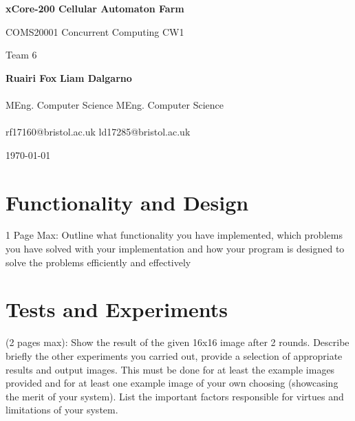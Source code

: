 \documentclass{article}
\begin{document}
    \begin{titlepage}
        \begin{center}
            \vspace*{2cm}
            
            {\huge \textbf{xCore-200 Cellular Automaton Farm}}
            
            \vspace{0.5cm}
            
            {\Large COMS20001 Concurrent Computing CW1}
            
            \vspace{0.5cm}
            
            {\large Team 6}
            
            \vspace{1cm}
            
            \hspace*{1cm} {\Large \textbf{Ruairi Fox}} \hfill {\Large \textbf{Liam Dalgarno}} \hspace*{1cm} \\~\\[-0.5em]
            \hspace*{1cm} MEng. Computer Science \hfill MEng. Computer Science  \hspace*{1cm} \\~\\[-1em]
            \hspace*{1cm} rf17160@bristol.ac.uk  \hfill ld17285@bristol.ac.uk  \hspace*{1cm} 
            
            \vspace{1cm}
            
            {\large \today}
        \end{center}
    \end{titlepage}

    \section{Functionality and Design}
    1 Page Max: Outline what functionality you have implemented, which problems you have solved with your implementation and how your program is designed to solve the problems efficiently and effectively
    \pagebreak

    \section{Tests and Experiments}
    (2 pages max): Show the result of the given 16x16 image after 2 rounds. Describe briefly the other experiments you carried out, provide a selection of appropriate results and output images. This must be done for at least the example images provided and for at least one example image of your own choosing (showcasing the merit of your system). List the important factors responsible for virtues and limitations of your system. 
    \pagebreak
\end{document}
